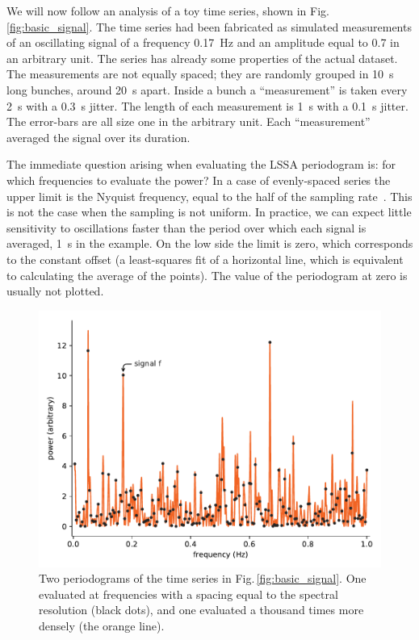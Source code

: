 We will now follow an analysis of a toy time series, shown in Fig.\,\ref{fig:basic_signal}. The time series had been fabricated as simulated measurements of an oscillating signal of a frequency \SI{0.17}{\hertz} and an amplitude equal to \num{0.7} in an arbitrary unit.
The series has already some properties of the actual dataset. The measurements are not equally spaced; they are randomly grouped in \SI{10}{\second} long bunches, around \SI{20}{\second} apart. Inside a bunch a ``measurement'' is taken every \SI{2}{\second} with a \SI{0.3}{\second} jitter. The length of each measurement is \SI{1}{\second} with a \SI{0.1}{\second} jitter. The error-bars are all size one in the arbitrary unit. Each ``measurement'' averaged the signal over its duration.

The immediate question arising when evaluating the LSSA periodogram is: for which frequencies to evaluate the power? In a case of evenly-spaced series the upper limit is the Nyquist frequency, equal to the half of the sampling rate~\cite{Shannon1949}.
This is not the case when the sampling is not uniform. In practice, we can expect little sensitivity to oscillations faster than the period over which each signal is averaged, \SI{1}{\second} in the example. On the low side the limit is zero, which corresponds to the constant offset (a least-squares fit of a horizontal line, which is equivalent to calculating the average of the points). The value of the periodogram at zero is usually not plotted.

\begin{figure}
  \centering
  \includegraphics[width=\linewidth]{gfx/axions/basic_periodogram.pdf}
  \caption{Two periodograms of the time series in Fig.\,\ref{fig:basic_signal}. One evaluated at frequencies with a spacing equal to the spectral resolution (black dots), and one evaluated a thousand times more densely (the orange line).}\label{fig:basic_periodogram}
\end{figure}

